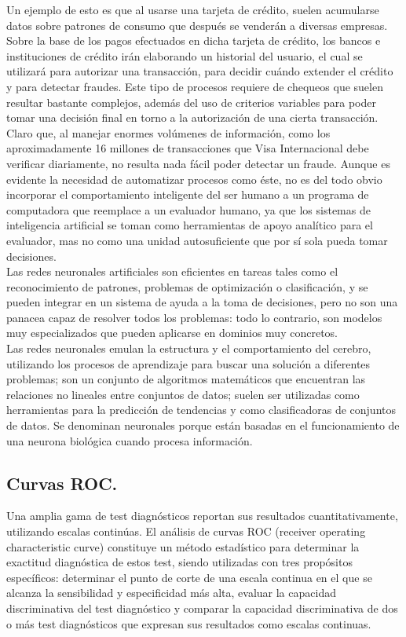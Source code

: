 Un ejemplo de esto es que al usarse una tarjeta de crédito, suelen acumularse datos sobre patrones de consumo que después se venderán a diversas empresas. Sobre la base de los pagos efectuados en dicha tarjeta de crédito, los bancos e instituciones de crédito irán elaborando un historial del usuario, el cual se utilizará para autorizar una transacción, para decidir cuándo extender el crédito y para detectar fraudes. Este tipo de procesos requiere de chequeos que suelen resultar bastante complejos, además del uso de criterios variables para poder tomar una decisión final en torno a la autorización de una cierta transacción. Claro que, al manejar enormes volúmenes de información, como los aproximadamente 16 millones de transacciones que Visa Internacional debe verificar diariamente, no resulta nada fácil poder detectar un fraude. Aunque es evidente la necesidad de automatizar procesos como éste, no es del todo obvio incorporar el comportamiento inteligente del ser humano a un programa de computadora que reemplace a un evaluador humano, ya que los sistemas de inteligencia artificial se toman como herramientas de apoyo analítico para el evaluador, mas no como una unidad autosuficiente que por sí sola pueda tomar decisiones.\\

Las redes neuronales artificiales son eficientes en tareas tales como el reconocimiento de patrones, problemas de optimización o clasificación, y se pueden integrar en un sistema de ayuda a la toma de decisiones, pero no son una panacea capaz de resolver todos los problemas: todo lo contrario, son modelos muy especializados que pueden aplicarse en dominios muy concretos.\\

Las redes neuronales emulan la estructura y el comportamiento del cerebro, utilizando los procesos de aprendizaje para buscar una solución a diferentes problemas; son un conjunto de algoritmos matemáticos que encuentran las relaciones no lineales entre conjuntos de datos; suelen ser utilizadas como herramientas para la predicción de tendencias y como clasificadoras de conjuntos de datos. Se denominan neuronales porque están basadas en el funcionamiento de una neurona biológica cuando procesa información.

\subsection{Curvas ROC.}

Una amplia gama de test diagnósticos reportan sus resultados cuantitativamente, utilizando escalas continúas. El análisis de curvas ROC (receiver operating characteristic curve) constituye un método estadístico para determinar la exactitud diagnóstica de estos test, siendo utilizadas con tres propósitos específicos: determinar el punto de corte de una escala continua en el que se alcanza la sensibilidad y especificidad más alta, evaluar la capacidad discriminativa del test diagnóstico y comparar la capacidad discriminativa de dos o más test diagnósticos que expresan sus resultados como escalas continuas.

